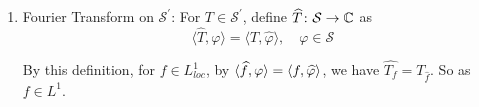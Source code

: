 \begin{enumerate}
	For $T \in \mathcal{S}^\prime$ and $\alpha$, $x^\alpha T \colon \mathcal{S} \sto \C$ is defined as
	\begin{equation*}
		\left\langle x^\alpha T, \varphi\right\rangle=\left\langle T, x^\alpha \varphi\right\rangle
	\end{equation*}
	where $x^\alpha \varphi$ is $x \mapsto x^\alpha \varphi(x)$. Note that for $\varphi \in \mathcal{S}$, $x^\alpha \varphi \in \mathcal{S}$.
	\begin{prop}
		For $T \in \mathcal{S}^\prime$ and $\alpha$, $x^\alpha T, \partial^\alpha T \in \mathcal{S}^{\prime}$.
	\end{prop}
	\begin{proof}
		For $\varphi \in \mathcal{S}$,
		\begin{equation*}
			\begin{aligned}
				& \left|\left\langle x^\alpha T, \varphi\right\rangle\right|=\left|\left\langle T, x^\alpha \varphi\right\rangle\right| \leq C\left\|x^\alpha \varphi\right\|_N \leq C\|\varphi\|_{N+|\alpha|}, \\
				& \left|\left\langle\partial^\alpha T, \varphi\right\rangle\right|=\left|\left\langle T, \partial^\alpha \varphi\right\rangle\right| \leq C\left\|\partial^\alpha \varphi\right\|_N \leq C\|\varphi\|_{N+|\alpha|}
			\end{aligned}
		\end{equation*}
		So $x^\alpha T, \partial^\alpha T \in \mathcal{S}^{\prime}$.
	\end{proof}

	\item Fourier Transform on $\mathcal{S}^\prime$: For $T \in \mathcal{S}^\prime$, define $\widehat{T} \colon \mathcal{S} \rightarrow \mathbb{C}$ as
	\begin{equation*}
		\langle\widehat{T}, \varphi\rangle=\langle T, \widehat{\varphi}\rangle, \quad \varphi \in \mathcal{S}
	\end{equation*}
	\begin{rmk}
		By this definition, for $f \in L^1_{loc}$, by $\langle \widehat{f},\varphi \rangle = \langle f,\widehat{\varphi} \rangle$, we have $\widehat{T_f} = T_{\widehat{f}}$. So as $f \in L^1$.
	\end{rmk}


\end{enumerate}
